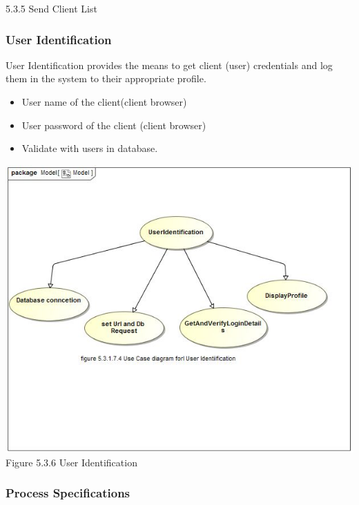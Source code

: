 \documentclass[hidelinks,a4paper,12pt]{article}
\begin{document}
	5.3.5 Send Client List
	 
	
		\subsubsection{User Identification}
	
	User Identification provides the means to get client (user) credentials and log them in the system to their appropriate profile. 
	
	\begin{itemize}
		\item User name of the client(client browser)
		\item User password of the client (client browser)
		\item Validate with users in database. 
	\end{itemize}
	
	
	\includegraphics[width=1\textwidth]{./Graphs/UseCaseforUserIdentification.JPG}\\[0.4cm]
	Figure 5.3.6 User Identification
	
	\subsubsection{Process Specifications}
	
\end{document}
